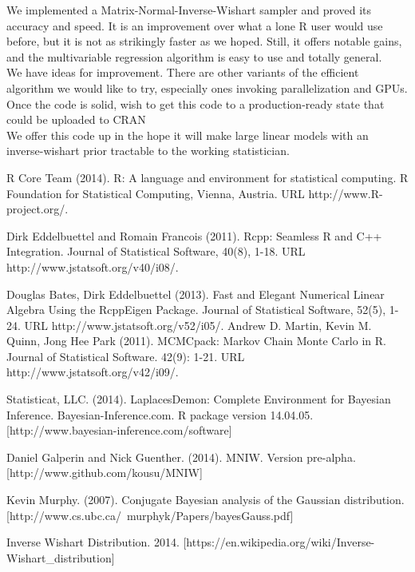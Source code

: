 \documentclass[english]{report}
\begin{document}

We implemented a Matrix-Normal-Inverse-Wishart sampler and proved its accuracy and speed. It is an improvement over what a lone R user would use before, but it is not as strikingly faster as we hoped. Still, it offers notable gains, and the multivariable regression algorithm is easy to use and totally general.\\

We have ideas for improvement. There are other variants of the efficient algorithm we would like to try, especially ones invoking parallelization and GPUs.  Once the code is solid, wish to get this code to a production-ready state that could be uploaded to CRAN \cite{R} \\

We offer this code \cite{MNIW} up in the hope it will make large linear models with an inverse-wishart prior tractable to the working statistician.



\newpage


\begin{thebibliography}{9}

R Core Team (2014). R: A language and environment for statistical computing. R Foundation for
  Statistical Computing, Vienna, Austria. URL http://www.R-project.org/.
  
 Dirk Eddelbuettel and Romain Francois (2011). Rcpp: Seamless R and C++ Integration. Journal of
  Statistical Software, 40(8), 1-18. URL http://www.jstatsoft.org/v40/i08/.

Douglas Bates, Dirk Eddelbuettel (2013). Fast and Elegant Numerical Linear Algebra Using the
  RcppEigen Package. Journal of Statistical Software, 52(5), 1-24. URL
  http://www.jstatsoft.org/v52/i05/.
Andrew D. Martin, Kevin M. Quinn, Jong Hee Park (2011). MCMCpack: Markov Chain Monte Carlo in R.
  Journal of Statistical Software. 42(9): 1-21. URL http://www.jstatsoft.org/v42/i09/. 
 
Statisticat, LLC. (2014). LaplacesDemon: Complete Environment for
  Bayesian Inference. Bayesian-Inference.com. R package version
  14.04.05. [http://www.bayesian-inference.com/software] 
 
Daniel Galperin and Nick Guenther. (2014). MNIW. Version pre-alpha. [http://www.github.com/kousu/MNIW]

Kevin Murphy. (2007). Conjugate Bayesian analysis of the Gaussian distribution. [http://www.cs.ubc.ca/~murphyk/Papers/bayesGauss.pdf] 

 Inverse Wishart Distribution. 2014. [https://en.wikipedia.org/wiki/Inverse-Wishart_distribution]

 
 
 \end{thebibliography}
\end{document}
